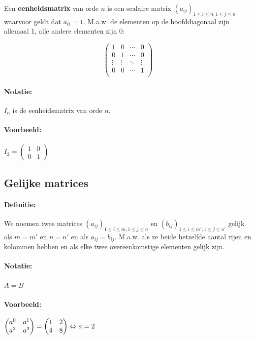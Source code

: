 \documentclass[12pt,twoside]{article}
\begin{document}
Een {\bf eenheidsmatrix} van orde $n$ is een scalaire matrix $(a_{ij})_{1 \leq i \leq n , 1 \leq j \leq n}$ waarvoor geldt dat $a_{ii}=1$. M.a.w. de elementen op de hoofddiagonaal zijn allemaal 1, alle andere elementen zijn 0:

$$
\begin{pmatrix}
  1 & 0 & \cdots & 0 \\
  0 & 1 & \cdots & 0 \\
  \vdots & \vdots & \ddots & \vdots \\
  0 & 0 & \cdots & 1 \\
\end{pmatrix}
$$

\paragraph*{Notatie:} $I_n$ is de eenheidsmatrix van orde $n$.

\paragraph*{Voorbeeld:}

$I_2=
\begin{pmatrix}
  1 & 0 \\ 0 & 1
\end{pmatrix}
$

\subsection{Gelijke matrices}

\paragraph*{Definitie: } We noemen twee matrices $(a_{ij})_{1 \leq i \leq m , 1 \leq j \leq n}$ en $(b_{ij})_{1 \leq i \leq m' , 1 \leq j \leq n'}$ gelijk als $m=m'$ en $n=n'$ en als $a_{ij}=b_{ij}$. M.a.w. als ze beide hetzelfde aantal rijen en kolommen hebben en als elke twee overeenkomstige elementen gelijk zijn.

\paragraph*{Notatie:} $A=B$

\paragraph*{Voorbeeld:}
$
\begin{pmatrix}a^0 & a^1\\ a^2 & a^3\end{pmatrix}
=
\begin{pmatrix}1 & 2\\ 4 & 8\end{pmatrix}
\Leftrightarrow
a = 2$
\end{document}

